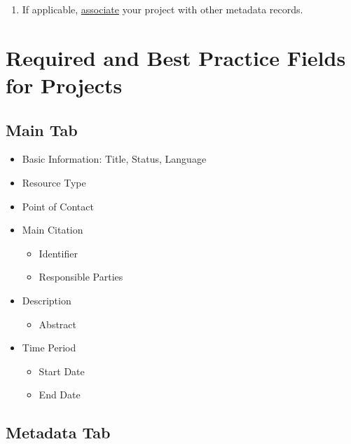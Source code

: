 \documentclass[
]{book}
\providecommand{\tightlist}{%
  \setlength{\itemsep}{0pt}\setlength{\parskip}{0pt}}
\begin{document}
\begin{enumerate}
\def\labelenumi{\arabic{enumi}.}
\setcounter{enumi}{4}
\tightlist
\item
  If applicable, \protect\hyperlink{project-associations}{associate} your project with other metadata records.
\end{enumerate}

\hypertarget{required-and-best-practice-fields-for-projects}{%
\section{Required and Best Practice Fields for Projects}\label{required-and-best-practice-fields-for-projects}}

\hypertarget{main-tab-1}{%
\subsection{Main Tab}\label{main-tab-1}}

\begin{itemize}
\tightlist
\item
  Basic Information: Title, Status, Language
\item
  Resource Type
\item
  Point of Contact
\item
  Main Citation

  \begin{itemize}
  \tightlist
  \item
    Identifier
  \item
    Responsible Parties
  \end{itemize}
\item
  Description

  \begin{itemize}
  \tightlist
  \item
    Abstract
  \end{itemize}
\item
  Time Period

  \begin{itemize}
  \tightlist
  \item
    Start Date
  \item
    End Date
  \end{itemize}
\end{itemize}

\hypertarget{metadata-tab}{%
\subsection{Metadata Tab}\label{metadata-tab}}
\end{document}
